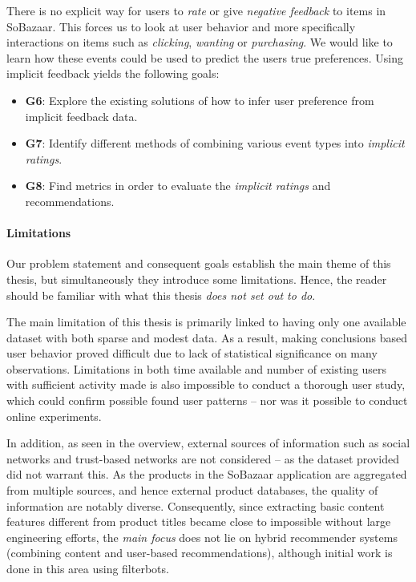 There is no explicit way for users to \textit{rate} or give \textit{negative
feedback} to items in SoBazaar. This forces us to look at user behavior and
more specifically interactions on items such as \textit{clicking},
\textit{wanting} or \textit{purchasing}. We would like to learn how these
events could be used to predict the users true preferences. Using implicit
feedback yields the following goals:

\begin{itemize}
  \item \textbf{G6}: Explore the existing solutions of how to infer user preference from
  implicit feedback data.
  \item \textbf{G7}: Identify different methods of combining various event types into
  \emph{implicit ratings}.
  \item \textbf{G8}: Find metrics in order to evaluate the \emph{implicit
  ratings} and recommendations.
\end{itemize}

\paragraph{Limitations} Our problem statement and consequent goals establish
the main theme of this thesis, but simultaneously they introduce some
limitations. Hence, the reader should be familiar with what this thesis
\textit{does not set out to do}.

The main limitation of this thesis is primarily linked to having only one
available dataset with both sparse and modest data. As a result, making
conclusions based user behavior proved difficult due to lack of statistical
significance on many observations. Limitations in both time available and
number of existing users with sufficient activity made is also impossible to
conduct a thorough user study, which could confirm possible found user
patterns -- nor was it possible to conduct online experiments.

In addition, as seen in the overview, external sources of information such as
social networks and trust-based networks are not considered -- as the dataset
provided did not warrant this. As the products in the SoBazaar application are
aggregated from multiple sources, and hence external product databases, the
quality of information are notably diverse. Consequently, since extracting
basic content features different from product titles became close to impossible
without large engineering efforts, the \textit{main focus} does not lie on
hybrid recommender systems (combining content and user-based recommendations),
although initial work is done in this area using filterbots.

